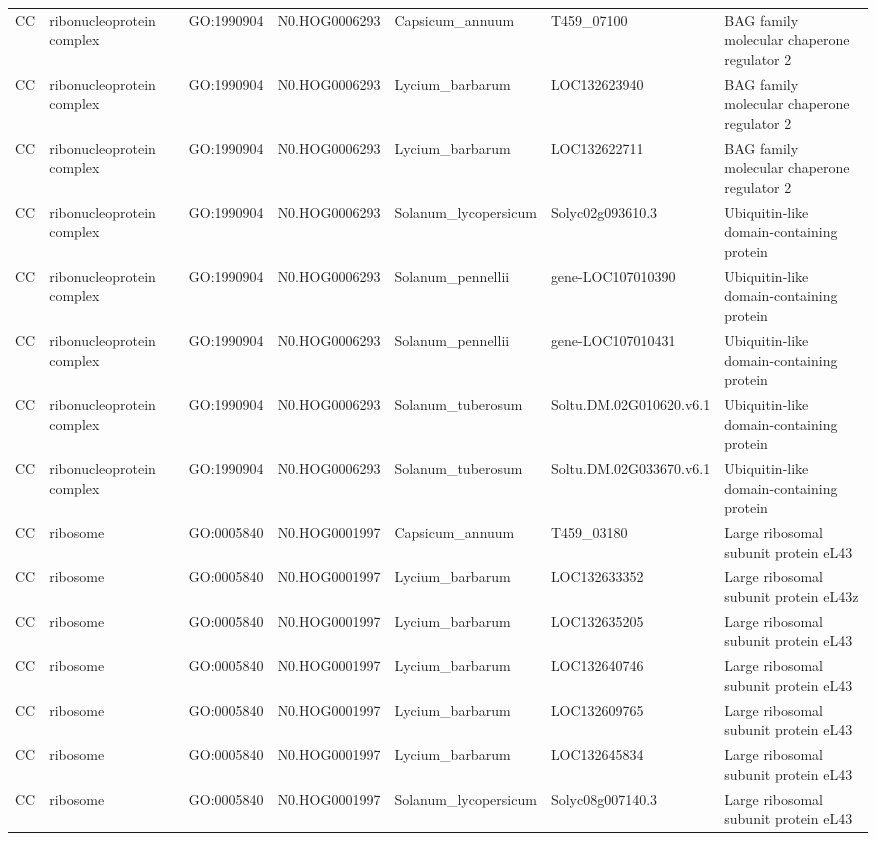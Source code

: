 \begin{table}
\begin{tabular}[t]{lllllll}
CC & ribonucleoprotein complex & GO:1990904 & N0.HOG0006293 & Capsicum\_annuum & T459\_07100 & BAG family molecular chaperone regulator 2\\
CC & ribonucleoprotein complex & GO:1990904 & N0.HOG0006293 & Lycium\_barbarum & LOC132623940 & BAG family molecular chaperone regulator 2\\
CC & ribonucleoprotein complex & GO:1990904 & N0.HOG0006293 & Lycium\_barbarum & LOC132622711 & BAG family molecular chaperone regulator 2\\
CC & ribonucleoprotein complex & GO:1990904 & N0.HOG0006293 & Solanum\_lycopersicum & Solyc02g093610.3 & Ubiquitin-like domain-containing protein\\
CC & ribonucleoprotein complex & GO:1990904 & N0.HOG0006293 & Solanum\_pennellii & gene-LOC107010390 & Ubiquitin-like domain-containing protein\\
CC & ribonucleoprotein complex & GO:1990904 & N0.HOG0006293 & Solanum\_pennellii & gene-LOC107010431 & Ubiquitin-like domain-containing protein\\
CC & ribonucleoprotein complex & GO:1990904 & N0.HOG0006293 & Solanum\_tuberosum & Soltu.DM.02G010620.v6.1 & Ubiquitin-like domain-containing protein\\
CC & ribonucleoprotein complex & GO:1990904 & N0.HOG0006293 & Solanum\_tuberosum & Soltu.DM.02G033670.v6.1 & Ubiquitin-like domain-containing protein\\
CC & ribosome & GO:0005840 & N0.HOG0001997 & Capsicum\_annuum & T459\_03180 & Large ribosomal subunit protein eL43\\
CC & ribosome & GO:0005840 & N0.HOG0001997 & Lycium\_barbarum & LOC132633352 & Large ribosomal subunit protein eL43z\\
CC & ribosome & GO:0005840 & N0.HOG0001997 & Lycium\_barbarum & LOC132635205 & Large ribosomal subunit protein eL43\\
CC & ribosome & GO:0005840 & N0.HOG0001997 & Lycium\_barbarum & LOC132640746 & Large ribosomal subunit protein eL43\\
CC & ribosome & GO:0005840 & N0.HOG0001997 & Lycium\_barbarum & LOC132609765 & Large ribosomal subunit protein eL43\\
CC & ribosome & GO:0005840 & N0.HOG0001997 & Lycium\_barbarum & LOC132645834 & Large ribosomal subunit protein eL43\\
CC & ribosome & GO:0005840 & N0.HOG0001997 & Solanum\_lycopersicum & Solyc08g007140.3 & Large ribosomal subunit protein eL43\\

\end{tabular}
\end{table}
